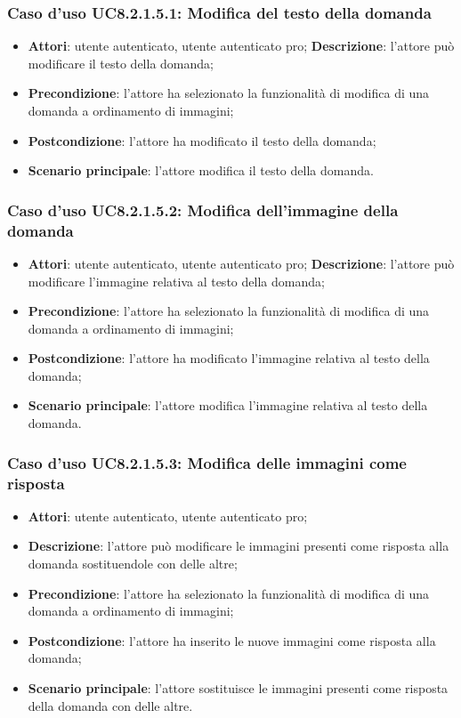 \subsubsection{Caso d'uso UC8.2.1.5.1: Modifica del testo della domanda}
\begin{itemize}
	\item\textbf{Attori}: utente autenticato, utente autenticato pro;
	\textbf{Descrizione}: l'attore può modificare il testo della domanda;
		\item
			\textbf{Precondizione}: l'attore ha selezionato la funzionalità di modifica di una domanda a ordinamento di immagini; 
		\item
			\textbf{Postcondizione}: l'attore ha modificato il testo della domanda;
		\item
			\textbf{Scenario principale}: l'attore modifica il testo della domanda.	
	\end{itemize}

\subsubsection{Caso d'uso UC8.2.1.5.2: Modifica dell'immagine della domanda}
\begin{itemize}
	\item\textbf{Attori}: utente autenticato, utente autenticato pro;
	\textbf{Descrizione}: l'attore può modificare l'immagine relativa al testo della domanda;
		\item
			\textbf{Precondizione}: l'attore ha selezionato la funzionalità di modifica di una domanda a ordinamento di immagini; 
		\item
			\textbf{Postcondizione}: l'attore ha modificato l'immagine relativa al testo della domanda;
		\item
			\textbf{Scenario principale}: l'attore modifica l'immagine relativa al testo della domanda. 	
	\end{itemize}

\subsubsection{Caso d'uso UC8.2.1.5.3: Modifica delle immagini come risposta}
\begin{itemize}
	\item\textbf{Attori}: utente autenticato, utente autenticato pro;
	\item\textbf{Descrizione}: l'attore può modificare le immagini presenti come risposta alla domanda sostituendole con delle altre;
	\item\textbf{Precondizione}: l'attore ha selezionato la funzionalità di modifica di una domanda a ordinamento di immagini;
	\item \textbf{Postcondizione}: l'attore ha inserito le nuove immagini come risposta alla domanda;
	\item\textbf{Scenario principale}: l'attore sostituisce le immagini presenti come risposta della domanda con delle altre.
\end{itemize}

